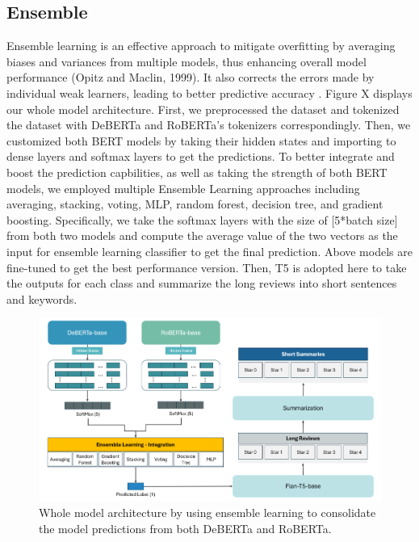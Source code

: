 \documentclass[12pt]{article}
\begin{document}
\subsection{Ensemble}
Ensemble learning is an effective approach to mitigate overfitting by averaging biases and variances from multiple models, thus enhancing overall model performance (Opitz and Maclin, 1999). It also corrects the errors made by individual weak learners, leading to better predictive accuracy \citep{schapire1990strength}. Figure X displays our whole model architecture. First, we preprocessed the dataset and tokenized the dataset with DeBERTa and RoBERTa’s tokenizers correspondingly. Then, we customized both BERT models by taking their hidden states and importing to dense layers and softmax layers to get the predictions. To better integrate and boost the prediction capbilities, as well as taking the strength of both BERT models, we employed multiple Ensemble Learning approaches including averaging, stacking, voting, MLP, random forest, decision tree, and gradient boosting. Specifically, we take the softmax layers with the size of [5*batch size] from both two models and compute the average value of the two vectors as the input for ensemble learning classifier to get the final prediction. Above models are fine-tuned to get the best performance version. Then, T5 is adopted here to take the outputs for each class and summarize the long reviews into short sentences and keywords.

\begin{figure}[h!]
  \centering
  \includegraphics[width=1.0\textwidth, height=0.3\textheight]{./model_architecture.png}
  \caption{Whole model architecture by using ensemble learning to consolidate the model predictions from both DeBERTa and RoBERTa.}
  \label{fig:model_architecture}
\end{figure}
\end{document}
